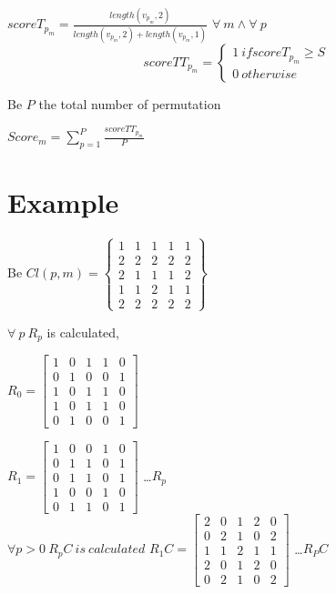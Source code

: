\documentclass[12pt]{article}
\begin{document}
  $ scoreT_{p_m}= \frac{ length(v_{p_m},2)}{length(v_{p_m},2)+length(v_{p_m},1)}$ 
$\forall \ m  \land \forall \ p $
 \[
   scoreTT_{p_m}=\left\{
                \begin{array}{ll}
                 1 \ if scoreT_{p_m} \geq S \\
                 0 \ otherwise 
                \end{array}
              \right.
  \]
  
Be $P$ the total number of permutation 

$Score_m= \sum\limits_{p=1}^P \frac{scoreTT_{p_m}}{P} $


\section{Example}
Be $Cl(p,m)= \begin{Bmatrix}
 1 & 1 & 1 & 1 & 1 \\
 2 & 2 & 2 & 2 & 2 \\
 2 & 1 & 1 & 1 & 2 \\
 1 & 1 & 2 & 1 & 1 \\
 2 & 2 & 2 & 2 & 2 
\end{Bmatrix}  $

$\forall \ p  \ R_p $ is calculated, 

$ R_0=\begin{bmatrix}
1 & 0 & 1 & 1 & 0 \\
0 & 1 & 0 & 0 & 1 \\
1 & 0 & 1 & 1 & 0 \\
1 & 0 & 1 & 1 & 0 \\
0 & 1 & 0 & 0 & 1 
\end{bmatrix}  $

$ R_1=\begin{bmatrix}
1 & 0 & 0 & 1 & 0 \\
0 & 1 & 1 & 0 & 1 \\
0 & 1 & 1 & 0 & 1 \\
1 & 0 & 0 & 1 & 0 \\
0 & 1 & 1 & 0 & 1 
\end{bmatrix}  $
\dots $R_p$
\\
$ \forall p > 0 \ R_pC \ is \ calculated$
$ R_1C=\begin{bmatrix}
2 & 0 & 1 & 2 & 0 \\
0 & 2 & 1 & 0 & 2 \\
1 & 1 & 2 & 1 & 1 \\
2 & 0 & 1 & 2 & 0 \\
0 & 2 & 1 & 0 & 2 
\end{bmatrix}  $
\dots $R_PC$
\end{document}
